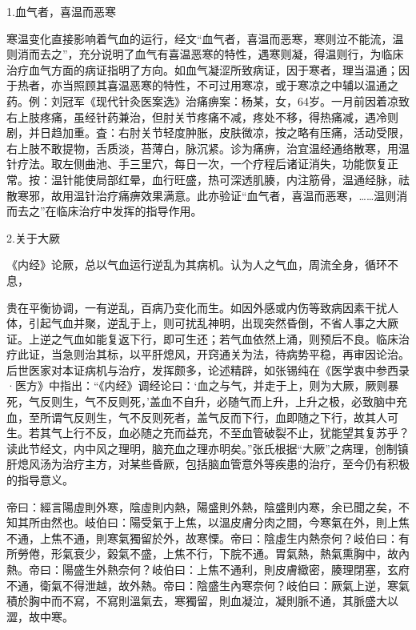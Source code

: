 \documentclass[draft,12pt]{ctexbook}
\begin{document}

1.血气者，喜温而恶寒

寒温变化直接影响着气血的运行，经文“血气者，喜温而恶寒，寒则泣不能流，温则消而去之”，充分说明了血气有喜温恶寒的特性，遇寒则凝，得温则行，为临床治疗血气方面的病证指明了方向。如血气凝涩所致病证，因于寒者，理当温通；因于热者，亦当照顾其喜温恶寒的特性，不可过用寒凉，或于寒凉之中辅以温通之药。例：刘冠军《现代针灸医案选》治痛痹案：杨某，女，64岁。一月前因着凉致右上肢疼痛，虽经针药兼治，但肘关节疼痛不减，疼处不移，得热痛减，遇冷则剧，并日趋加重。査：右肘关节轻度肿胀，皮肤微凉，按之略有压痛，活动受限，右上肢不敢提物，舌质淡，苔薄白，脉沉紧。诊为痛痹，治宜温经通络散寒，用温针疗法。取左侧曲池、手三里穴，每日一次，一个疗程后诸证消失，功能恢复正常。按：温针能使局部红晕，血行旺盛，热可深透肌腠，内注筋骨，温通经脉，祛散寒邪，故用温针治疗痛痹效果满意。此亦验证“血气者，喜温而恶寒，……温则消而去之”在临床治疗中发挥的指导作用。

2.关于大厥

《内经》论厥，总以气血运行逆乱为其病机。认为人之气血，周流全身，循环不息，

贵在平衡协调，一有逆乱，百病乃变化而生。如因外感或内伤等致病因素干扰人体，引起气血并聚，逆乱于上，则可扰乱神明，出现突然昏倒，不省人事之大厥证。上逆之气血如能复返下行，即可生还；若气血依然上涌，则预后不良。临床治疗此证，当急则治其标，以平肝熄风，开窍通关为法，待病势平稳，再审因论治。后世医家对本证病机与治疗，发挥颇多，论述精辟，如张锡纯在《医学衷中参西录·医方》中指出：“《内经》调经论曰：‘血之与气，并走于上，则为大厥，厥则暴死，气反则生，气不反则死，’盖血不自升，必随气而上升，上升之极，必致脑中充血，至所谓气反则生，气不反则死者，盖气反而下行，血即随之下行，故其人可生。若其气上行不反，血必随之充而益充，不至血管破裂不止，犹能望其复苏乎？读此节经文，内中风之理明，脑充血之理亦明矣。”张氏根据“大厥”之病理，创制镇肝熄风汤为治疗主方，对某些昏厥，包括脑血管意外等疾患的治疗，至今仍有积极的指导意义。


\begin{yuanwen}
帝曰：經言陽虛則外寒，陰虛則内熱，陽盛則外熱，陰盛則内寒，余已聞之矣，不知其所由然也。岐伯曰：陽受氣于上焦，以溫皮膚分肉之間，今寒氣在外，則上焦不通，上焦不通，則寒氣獨留於外，故寒慄。帝曰：陰虛生内熱奈何？岐伯曰：有所勞倦，形氣衰少，榖氣不盛，上焦不行，下脘不通。胃氣熱，熱氣熏胸中，故內熱。帝曰：陽盛生外熱奈何？岐伯曰：上焦不通利，則皮膚緻密，腠理閉塞，玄府不通，衛氣不得泄越，故外熱。帝曰：陰盛生內寒奈何？岐伯曰：厥氣上逆，寒氣積於胸中而不寫，不寫則溫氣去，寒獨留，則血凝泣，凝則脈不通，其脈盛大以澀，故中寒。
\end{yuanwen}
\end{document}
